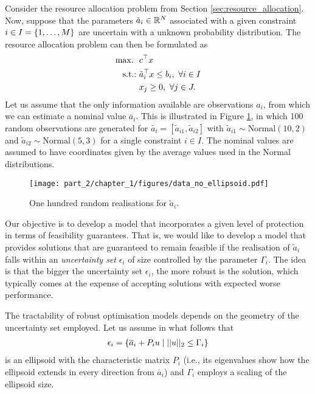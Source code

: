 Consider the resource allocation problem from Section \ref{sec:resource_allocation}. Now, suppose that the parameters $\tilde{a}_i \in \mathbb{R}^N $ associated with a given constraint $i \in I = \left\{ 1,\dots,M \right \}$ are uncertain with a unknown probability distribution. The resource allocation problem can then be formulated as
%
\begin{align*}
	\mathop{\text{max.~}} \ &  c^\top x  \\
	\mathop{\text{s.t.:~}} & \tilde{a}_{i}^\top x \leq b_i, \ \forall i \in I  \\
	& x_j \geq 0, \ \forall j \in J. 
\end{align*} 
%
Let us assume that the only information available are observations $\hat{a}_i$, from which we can estimate a nominal value $\overline{a}_i$. This is illustrated in Figure \ref{fig:random_observations}, in which 100 random observations are generated for $\tilde{a_i} = [\tilde{a}_{i1}, \tilde{a}_{i2}]$ with $\tilde{a}_{i1} \sim \text{Normal}(10,2)$ and $\tilde{a}_{i2} \sim \text{Normal}(5,3)$ for a single constraint $i \in I$. The nominal values are assumed to have coordinates given by the average values used in the Normal distributions. 
%
\begin{figure}[h]
	\texttt{[image: part\_2/chapter\_1/figures/data\_no\_ellipsoid.pdf]}
	\caption{One hundred random realisations for $\tilde{a}_i$.} \label{fig:random_observations}
\end{figure}
%
Our objective is to develop a model that incorporates a given level of protection in terms of feasibility guarantees. That is, we would like to develop a model that provides solutions that are guaranteed to remain feasible if the realisation of $\tilde{a}_i$ falls within an \emph{uncertainty set} $\epsilon_i$ of size controlled by the parameter $\Gamma_i$. The idea is that the bigger the uncertainty set $\epsilon_i$, the more robust is the solution, which typically comes at the expense of accepting solutions with expected worse performance.

The tractability of robust optimisation models depends on the geometry of the uncertainty set employed. Let us assume in what follows that 
%
\begin{align}
	\epsilon_i = \left\{ \overline{a}_i + P_iu \mid ||u||_2 \leq \Gamma_i \right \} \label{eq:ellipsoid}
\end{align}
%
is an ellipsoid with the characteristic matrix $P_i$ (i.e., its eigenvalues show how the ellipsoid extends in every direction from $\overline{a}_i$) and $\Gamma_i$ employs a scaling of the ellipsoid size.

